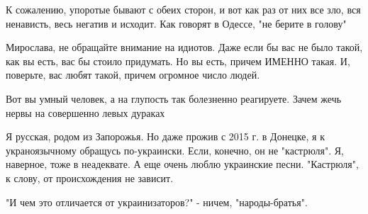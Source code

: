 \begin{itemize}
 

К сожалению, упоротые бывают с обеих сторон, и вот как раз от них все зло, вся
ненависть, весь негатив и исходит. Как говорят в Одессе, "не берите в голову"


 

Мирослава, не обращайте внимание на идиотов. Даже если бы вас не было такой,
как вы есть, вас бы стоило придумать. \Smiley[1.0][yellow] Но вы есть, причем ИМЕННО такая. И,
поверьте, вас любят такой, причем огромное число людей.


 

Вот вы умный человек, а на глупость так болезненно реагируете. Зачем жечь нервы
на совершенно левых дураках


 

Я русская, родом из Запорожья. Но даже прожив с 2015 г. в Донецке, я к
украноязычному обращусь по-украински. Если, конечно, он не "кастрюля". Я,
наверное, тоже в неадеквате. А еще очень люблю украинские песни. \Smiley[1.0][yellow] "Кастрюля",
к слову, от происхождения не зависит.


 

"И чем это отличается от украинизаторов?" - ничем, "народы-братья".


 


\end{itemize}
